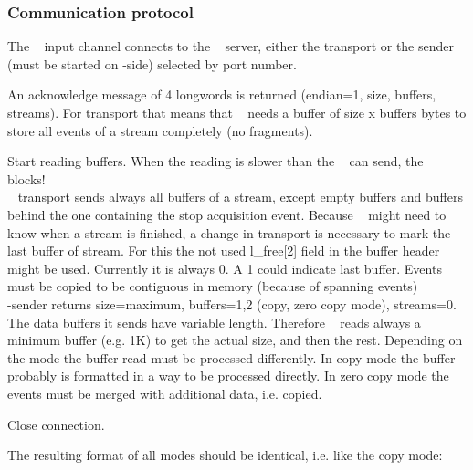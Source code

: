 \subsubsection{Communication protocol}
\begin{compactenum}
\item The \dabc~ input channel connects to the \mbs~ server, either the transport or the
sender (must be started on \mbs-side) selected by port number.
\item An acknowledge message of 4 longwords is returned (endian=1, size, buffers, streams).
For transport that means that \dabc~ needs a buffer of size x buffers bytes to store all
events of a stream completely (no fragments).
\item Start reading buffers. When the reading is slower than the \mbs~ can send,
the \mbs~ blocks!\\
\mbs~ transport sends always all buffers of a stream, except empty buffers
and buffers behind the one containing the stop acquisition event.
Because \dabc~ might need to know when a stream is finished, a change in transport is
necessary to mark the last buffer of stream. For this the not used
l\_free[2] field in the buffer header might be used.
Currently it is always 0. A 1 could indicate last buffer. Events must be copied
to be contiguous in memory (because of spanning events)\\
\mbs-sender returns size=maximum, buffers=1,2 (copy, zero copy mode), streams=0.
The data buffers it sends have variable length. Therefore \dabc~ reads always
a minimum buffer (e.g. 1K) to get the actual size, and then the rest.
Depending on the mode the buffer read must be processed differently.
In copy mode the buffer probably is formatted in a way to be processed directly.
In zero copy mode the events must be merged with additional data, i.e. copied.
\item Close connection.
\end{compactenum}
The resulting format of all modes should be identical, i.e. like the copy mode:
